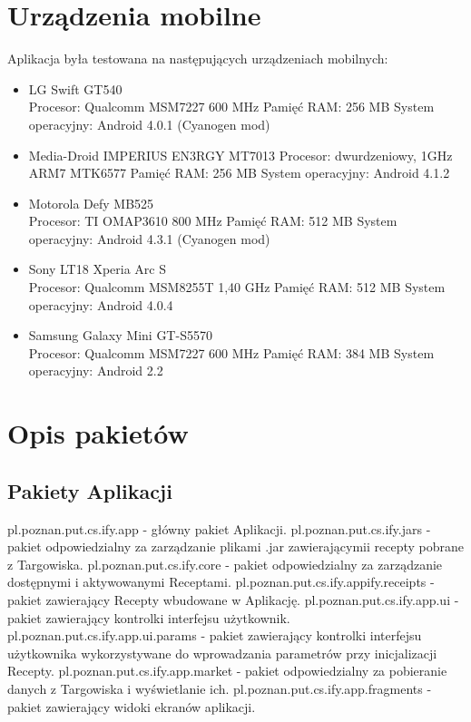 \documentclass[11pt,a4paper,polish,thesis]{dcsbook}
\begin{document}
\section{Urządzenia mobilne}
Aplikacja była testowana na następujących urządzeniach mobilnych:
\begin{itemize}
\item{LG Swift GT540} \\
Procesor: Qualcomm MSM7227 600 MHz
Pamięć RAM: 256 MB
System operacyjny: Android 4.0.1 (Cyanogen mod)
\item{Media-Droid IMPERIUS EN3RGY MT7013}
Procesor: dwurdzeniowy, 1GHz ARM7 MTK6577
Pamięć RAM: 256 MB
System operacyjny: Android 4.1.2
\item{Motorola Defy MB525} \\
Procesor: TI OMAP3610 800 MHz
Pamięć RAM: 512 MB
System operacyjny: Android 4.3.1 (Cyanogen mod)
\item{Sony LT18 Xperia Arc S} \\
Procesor: Qualcomm MSM8255T 1,40 GHz
Pamięć RAM: 512 MB
System operacyjny: Android 4.0.4
\item{Samsung Galaxy Mini GT-S5570} \\
Procesor: Qualcomm MSM7227 600 MHz
Pamięć RAM: 384 MB
System operacyjny: Android 2.2
\end{itemize}

\section{Opis pakietów}
\subsection{Pakiety Aplikacji}
pl.poznan.put.cs.ify.app - główny pakiet Aplikacji.
pl.poznan.put.cs.ify.jars - pakiet odpowiedzialny za zarządzanie plikami .jar zawierającymii recepty pobrane z Targowiska.
pl.poznan.put.cs.ify.core - pakiet odpowiedzialny za zarządzanie dostępnymi i aktywowanymi Receptami.
pl.poznan.put.cs.ify.appify.receipts - pakiet zawierający Recepty wbudowane w Aplikację.
pl.poznan.put.cs.ify.app.ui - pakiet zawierający kontrolki interfejsu użytkownik.
pl.poznan.put.cs.ify.app.ui.params - pakiet zawierający kontrolki interfejsu użytkownika wykorzystywane do wprowadzania parametrów przy inicjalizacji Recepty.
pl.poznan.put.cs.ify.app.market - pakiet odpowiedzialny za pobieranie danych z Targowiska i wyświetlanie ich.
pl.poznan.put.cs.ify.app.fragments - pakiet zawierający widoki ekranów aplikacji.
\end{document}
